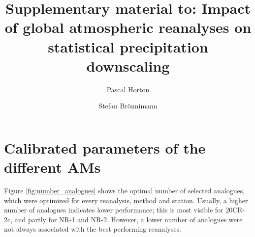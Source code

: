 \documentclass[twocolumn]{svjour3}       %
\date{}
\newcommand{\beginsupplement}{%
	\renewcommand{\thetable}{S\arabic{table}}%
	\renewcommand{\thefigure}{S\arabic{figure}}%
	\renewcommand{\thesection}{S\arabic{section}}%
}
\begin{document}
	
	\title{Supplementary material to: Impact of global atmospheric reanalyses on statistical precipitation downscaling
	}
	
	
	
	\author{Pascal Horton         \and
		Stefan Br\"{o}nnimann
	}


	
	
	
	\maketitle
	
	\beginsupplement
	

	\section{Calibrated parameters of the different AMs}
	\label{supp:parameters}

	Figure \ref{fig:number_analogues} shows the optimal number of selected analogues, which were optimized for every reanalysis, method and station. Usually, a higher number of analogues indicates lower performance; this is most visible for 20CR-2c, and partly for NR-1 and NR-2. However, a lower number of analogues were not always associated with the best performing reanalyses.
\end{document}
